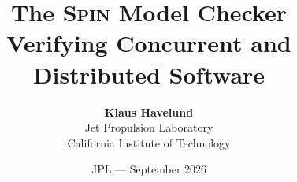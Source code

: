 \documentclass{beamer}
\title{The \textsc{Spin} Model Checker\\ {\normalsize Verifying Concurrent and Distributed Software}}
\author{{\bf Klaus Havelund}\\
Jet Propulsion Laboratory\\
California Institute of Technology\\
}
\date[]{JPL --- September 2026}
\begin{document}
\begin{frame}
  \titlepage
\end{frame}

\end{document}

